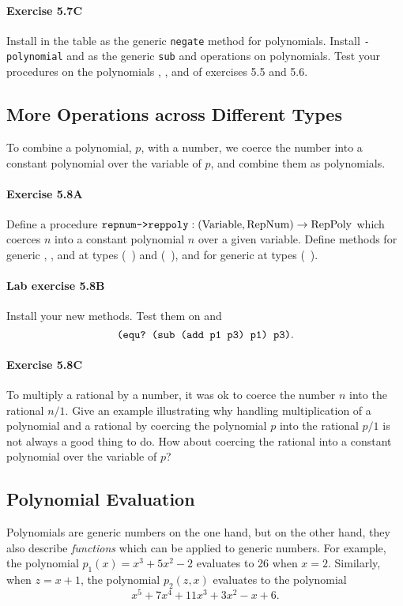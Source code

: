 \paragraph{Exercise 5.7C}
Install  in the table as the generic {\tt negate}
method for polynomials.  Install {\tt -polynomial} and
 as the generic {\tt sub} and  operations
on polynomials.  Test your procedures on the polynomials ,
, and  of exercises 5.5 and 5.6.

\subsection{More Operations across Different Types}
To combine a polynomial, $p$, with a number, we coerce the number into a
constant polynomial over the variable of $p$, and combine them as
polynomials.

\paragraph{Exercise 5.8A}
Define a procedure $\mbox{\tt repnum->reppoly}: (\mbox{Variable}, \mbox{RepNum}) \rightarrow \mbox{RepPoly}$ which
coerces $n$ into a constant polynomial $n$ over a given variable.  Define
methods for generic , ,  and  at
types (\numtag\ \polytag) and (\polytag\ \numtag), and for generic
 at types (\polytag\ \numtag).

\paragraph{Lab exercise 5.8B}
Install your new methods.  Test them on 
and \[\mbox{\tt (equ?\ (sub (add p1 p3) p1) p3)}.\]

\paragraph{Exercise 5.8C} To multiply a rational by a number, it
was ok to coerce the number $n$ into the rational $n/1$.  Give an example
illustrating why handling multiplication of a polynomial and a
rational by coercing the polynomial $p$ into the rational $p/1$ is not
always a good thing to do.  How about coercing the rational into a
constant polynomial over the variable of $p$?


\subsection{Polynomial Evaluation}
Polynomials are generic numbers on the one hand, but on the other hand,
they also describe {\em functions} which can be applied to generic
numbers.  For example, the polynomial $p_1(x) = x^3 + 5x^2 - 2$ evaluates
to 26 when $x=2$.  Similarly, when $z = x+1$, the polynomial $p_2(z,x)$
evaluates to the polynomial
\[x^5 + 7x^4 + 11x^3 + 3x^2 - x + 6.\]

